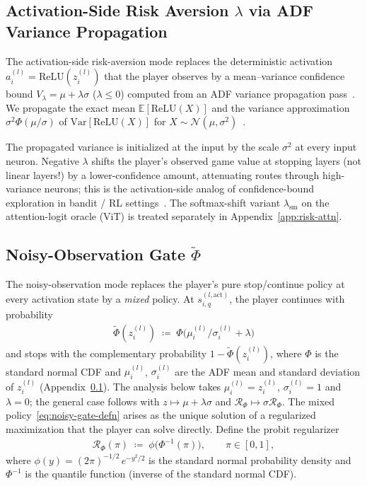 \documentclass[twoside]{article}
\providecommand{\E}{}
\renewcommand{\E}{\mathbb{E}}
\newcommand{\relu}{\text{ReLU}}
\newcommand{\1}{\mathbf{1}}
\begin{document}
\subsection{Activation-Side Risk Aversion \texorpdfstring{$\lambda$}{lambda} via ADF Variance Propagation}\label{app:adf-variance}

The activation-side risk-aversion mode replaces the deterministic activation $a_i^{(l)} =
    \relu(z_i^{(l)})$ that the player observes by a mean--variance confidence bound $V_\lambda = \mu +
    \lambda\sigma$ ($\lambda \le 0$) computed from an \ac{ADF} variance propagation
pass~\citep{gast2018lightweight}. We propagate the exact mean $\E[\relu(X)]$ and the variance
approximation $\sigma^2\Phi(\mu/\sigma)$ of $\mathrm{Var}[\relu(X)]$ for $X \sim \mathcal{N}(\mu,
    \sigma^2)$~\citep{gast2018lightweight}.

The propagated variance is initialized at the input by the scale $\sigma^2$ at every input neuron.
Negative $\lambda$ shifts the player's observed game value at stopping layers (not linear layers!)
by a lower-confidence amount, attenuating routes through high-variance neurons; this is the
activation-side analog of confidence-bound exploration in bandit / RL
settings~\citep{auer2002finite, zhang2021risk}. The softmax-shift variant $\lambda_{\mathrm{sm}}$
on the attention-logit oracle (\acs{ViT}) is treated separately in Appendix~\ref{app:risk-attn}.

\subsection{Noisy-Observation Gate \texorpdfstring{$\tilde\Phi$}{Phi}}\label{app:noisy-gate-mode}

The noisy-observation mode replaces the player's pure stop/continue policy at every activation
state by a \emph{mixed} policy. At $s_{i,q}^{(l, \text{act})}$, the player continues with
probability
\begin{align}\label{eq:noisy-gate-defn}
    \tilde\Phi(z_i^{(l)}) \;\coloneqq\; \Phi\bigl(\mu_i^{(l)}/\sigma_i^{(l)} + \lambda\bigr)
\end{align}
and stops with the complementary probability $1 - \tilde\Phi(z_i^{(l)})$, where $\Phi$ is the
standard normal \ac{CDF} and $\mu_i^{(l)}$, $\sigma_i^{(l)}$ are the \ac{ADF} mean and standard
deviation of $z_i^{(l)}$ (Appendix~\ref{app:adf-variance}). The analysis below takes
$\mu_i^{(l)}=z_i^{(l)}$, $\sigma_i^{(l)}=1$ and $\lambda=0$; the general case follows with $z
    \mapsto \mu+\lambda\sigma$ and $\mathcal{R}_\Phi \mapsto \sigma\mathcal{R}_\Phi$. The mixed
policy~\eqref{eq:noisy-gate-defn} arises as the unique solution of a regularized maximization that
the player can solve directly. Define the probit regularizer
\begin{align}\label{eq:noisy-gate-regulariser}
    \mathcal{R}_\Phi(\pi) \;\coloneqq\; \phi\!\bigl(\Phi^{-1}(\pi)\bigr),
    \qquad \pi \in [0,1],
\end{align}
where $\phi(y) = (2\pi)^{-1/2}\,e^{-y^2/2}$ is the standard normal probability density and
$\Phi^{-1}$ is the quantile function (inverse of the standard normal \ac{CDF}).
\end{document}
